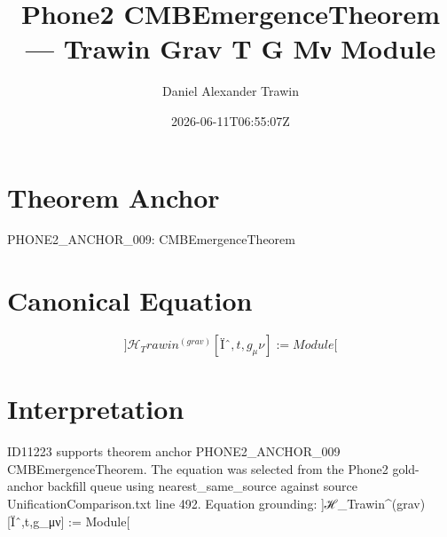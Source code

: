 \documentclass[11pt]{article}
\title{Phone2 CMBEmergenceTheorem — Trawin Grav T G Μν Module}
\author{Daniel Alexander Trawin}
\date{2026-06-11T06:55:07Z}
\begin{document}
\maketitle
\section*{Theorem Anchor}
PHONE2_ANCHOR_009: CMBEmergenceTheorem
\section*{Canonical Equation}
\[
]ℋ_Trawin^(grav)[Ïˆ,t,g_μν] := Module[
\]
\section*{Interpretation}
ID11223 supports theorem anchor PHONE2_ANCHOR_009 CMBEmergenceTheorem. The equation was selected from the Phone2 gold-anchor backfill queue using nearest_same_source against source UnificationComparison.txt line 492. Equation grounding: ]ℋ_Trawin^(grav)[Ïˆ,t,g_μν] := Module[
\end{document}
